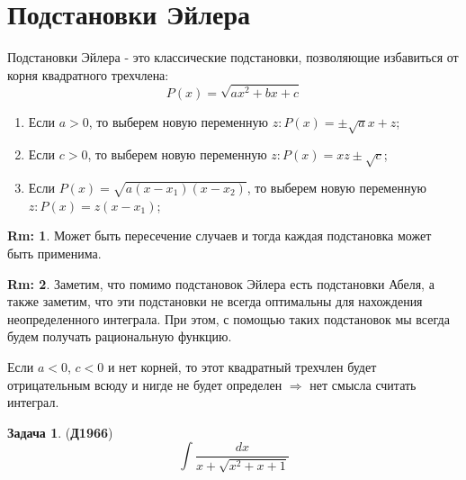 \documentclass[12pt]{article}
\theoremstyle{definition}
\newtheorem{rem}{Rm:}
\newtheorem{problem}{Задача}
\DeclareMathOperator{\dint}{\displaystyle\int}
\begin{document}
\section*{Подстановки Эйлера}
Подстановки Эйлера - это классические подстановки, позволяющие избавиться от корня квадратного трехчлена:
$$
	P(x) = \sqrt{ax^2 + bx + c}
$$
\begin{enumerate}[label=(\arabic*)]
	\item Если $a > 0$, то выберем новую переменную $z \colon P(x) = \pm \sqrt{a}x + z$;
	\item Если $c > 0$, то выберем новую переменную $z \colon P(x) = xz \pm \sqrt{c}$;
	\item Если $P(x) = \sqrt{a(x-x_1)(x - x_2)}$, то выберем новую переменную $z \colon P(x) = z(x- x_1)$;
\end{enumerate}
\begin{rem}
	Может быть пересечение случаев и тогда каждая подстановка может быть применима.
\end{rem}
\begin{rem}
	Заметим, что помимо подстановок Эйлера есть подстановки Абеля, а также заметим, что эти подстановки не всегда оптимальны для нахождения неопределенного интеграла. При этом, с помощью таких подстановок мы всегда будем получать рациональную функцию.
\end{rem}
Если $a < 0$, $c < 0$ и нет корней, то этот квадратный трехчлен будет отрицательным всюду и нигде не будет определен $\Rightarrow$ нет смысла считать интеграл. 
\begin{problem}(\textbf{Д1966})
	$$
		\dint \dfrac{dx}{x + \sqrt{x^2 + x + 1 }}
	$$
\end{problem}
\end{document}
